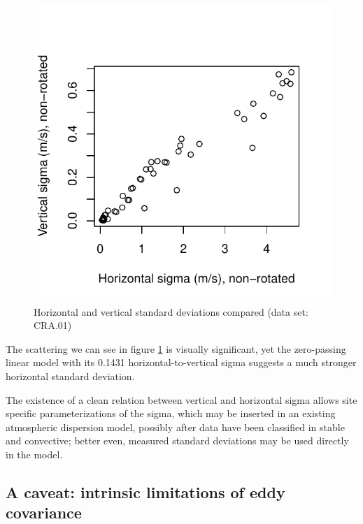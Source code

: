 \documentclass[a4paper,10pt]{book}
\begin{document}
\begin{figure}[htp]
 \centering
 \begin{center}
 \includegraphics[scale=1.1,keepaspectratio=true]{./diagrams/sigma_uv_vs_w.pdf}
 \end{center}
 \caption{Horizontal and vertical standard deviations compared (data set: CRA.01)}
 \label{fig:Sigma_uv_vs_w}
\end{figure}

The scattering we can see in figure \ref{fig:Sigma_uv_vs_w} is visually significant, yet the zero-passing linear model with its 0.1431 horizontal-to-vertical sigma suggests a much stronger horizontal standard deviation.

The existence of a clean relation between vertical and horizontal sigma allows site specific parameterizations of the sigma, which may be inserted in an existing atmospheric dispersion model, possibly after data have been classified in stable and convective; better even, measured standard deviations may be used directly in the model.

\subsection{A caveat: intrinsic limitations of eddy covariance}
\end{document}
